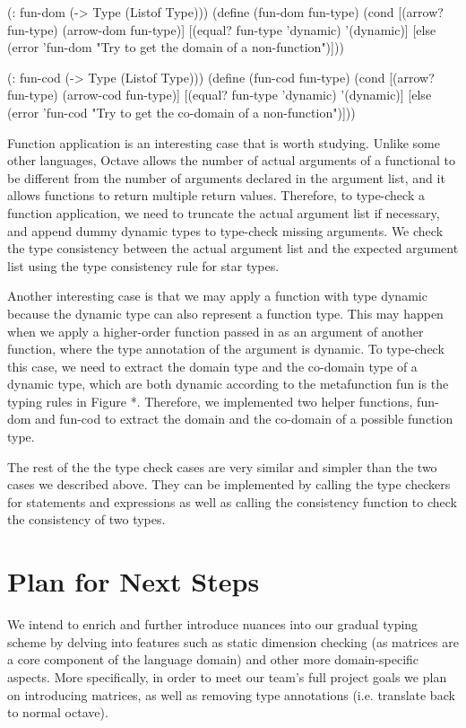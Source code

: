 (: fun-dom (-> Type (Listof Type)))
(define (fun-dom fun-type)
  (cond
    [(arrow? fun-type) (arrow-dom fun-type)]
    [(equal? fun-type 'dynamic) '(dynamic)]
    [else (error 'fun-dom "Try to get the domain of a non-function")]))

(: fun-cod (-> Type (Listof Type)))
(define (fun-cod fun-type)
  (cond
    [(arrow? fun-type) (arrow-cod fun-type)]
    [(equal? fun-type 'dynamic) '(dynamic)]
    [else (error 'fun-cod "Try to get the co-domain of a non-function")]))

Function application is an interesting case that is worth studying. Unlike some other languages, Octave allows the number of actual arguments of a functional to be different from the number of arguments declared in the argument list, and it allows functions to return multiple return values. Therefore, to type-check a function application, we need to truncate the actual argument list if necessary, and append dummy dynamic types to type-check missing arguments. We check the type consistency between the actual argument list and the expected argument list using the type consistency rule for star types.

Another interesting case is that we may apply a function with type dynamic because the dynamic type can also represent a function type. This may happen when we apply a higher-order function passed in as an argument of another function, where the type annotation of the argument is dynamic. To type-check this case, we need to extract the domain type and the co-domain type of a dynamic type, which are both dynamic according to the metafunction fun is the typing rules in Figure *. Therefore, we implemented two helper functions, fun-dom and fun-cod to extract the domain and the co-domain of a possible function type.

The rest of the the type check cases are very similar and simpler than the two cases we described above. They can be implemented by calling the type checkers for statements and expressions as well as calling the consistency function to check the consistency of two types. 


\section{Plan for Next Steps}
We intend to enrich and further introduce nuances into our gradual typing scheme by delving into features such as static dimension checking (as matrices are a core component of the language domain) and other more domain-specific aspects. More specifically, in order to meet our team’s full project goals we plan on introducing matrices, as well as removing type annotations (i.e. translate back to normal octave).

